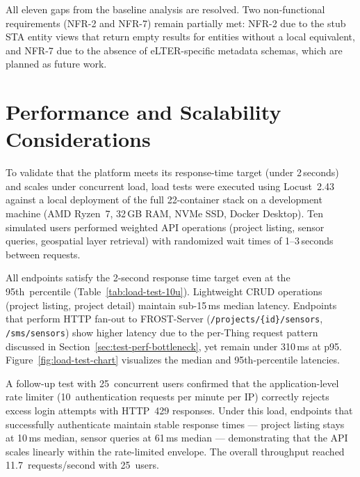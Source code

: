 All eleven gaps from the baseline analysis are resolved. Two non-functional requirements
(NFR-2 and NFR-7) remain partially met: NFR-2 due to the stub STA entity views that
return empty results for entities without a local equivalent, and NFR-7 due to the
absence of eLTER-specific metadata schemas, which are planned as future work.

\section{Performance and Scalability Considerations}
\label{sec:test-performance}

To validate that the platform meets its response-time target (under 2\,seconds) and
scales under concurrent load, load tests were executed using Locust~2.43 against a
local deployment of the full 22-container stack on a development machine (AMD Ryzen~7,
32\,GB RAM, NVMe SSD, Docker Desktop). Ten simulated users performed weighted API
operations (project listing, sensor queries, geospatial layer retrieval) with randomized
wait times of 1--3\,seconds between requests.

All endpoints satisfy the 2-second response time target even at the
95th~percentile (Table~\ref{tab:load-test-10u}). Lightweight CRUD operations (project
listing, project detail) maintain sub-15\,ms median latency. Endpoints that perform
HTTP fan-out to FROST-Server (\texttt{/projects/\{id\}/sensors},
\texttt{/sms/sensors}) show higher latency due to the per-Thing request pattern
discussed in Section~\ref{sec:test-perf-bottleneck}, yet remain under 310\,ms at p95.
Figure~\ref{fig:load-test-chart} visualizes the median and 95th-percentile latencies.

A follow-up test with 25~concurrent users confirmed that the application-level rate
limiter (10~authentication requests per minute per IP) correctly rejects excess login
attempts with HTTP~429 responses. Under this load, endpoints that successfully
authenticate maintain stable response times --- project listing stays at 10\,ms median,
sensor queries at 61\,ms median --- demonstrating that the API scales linearly within the
rate-limited envelope. The overall throughput reached 11.7~requests/second with
25~users.

